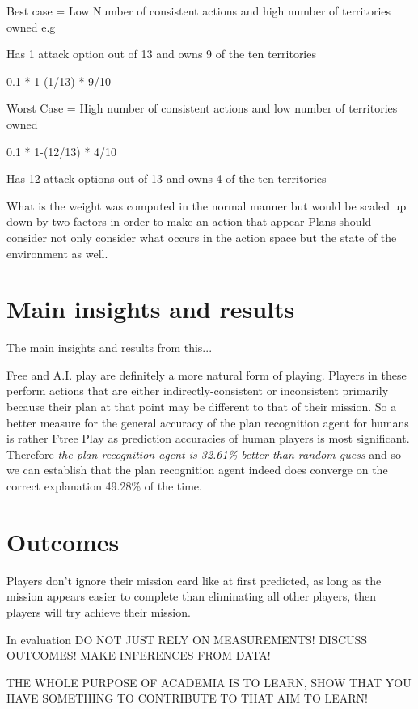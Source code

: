 \documentclass[parskip]{cs4rep}
\begin{document}
Best case = Low Number of consistent actions and high number of territories owned e.g

Has 1 attack option out of 13 and owns 9 of the ten territories

0.1 * 1-(1/13) * 9/10 

Worst Case = High number of consistent actions and low number of territories owned

0.1 * 1-(12/13) * 4/10 

Has 12 attack options out of 13 and owns 4 of the ten territories

What is the weight was computed in the normal manner but would be scaled up down by two factors in-order to make an action that appear
Plans should consider not only consider what occurs in the action space but the state of the environment as well.

\section{Main insights and results}

The main insights and results from this...

Free and A.I. play are definitely a more natural form of playing. Players in these perform actions that are either indirectly-consistent or inconsistent primarily because their plan at that point may be different to that of their mission. So a better measure for the general accuracy of the plan recognition  agent for humans is rather Ftree Play as prediction accuracies of human players is most significant. Therefore \textit{the plan recognition agent is 32.61\% better than random guess} and so we can establish that the plan recognition agent indeed does converge on the correct explanation 49.28\% of the time.

\section{Outcomes}

Players don't ignore their mission card like at first predicted, as long as the mission appears easier to complete than eliminating all other players, then players will try achieve their mission.

In evaluation DO NOT JUST RELY ON MEASUREMENTS! DISCUSS OUTCOMES! MAKE INFERENCES FROM DATA!

THE WHOLE PURPOSE OF ACADEMIA IS TO LEARN, SHOW THAT YOU HAVE SOMETHING TO CONTRIBUTE TO THAT AIM TO LEARN!
\end{document}
